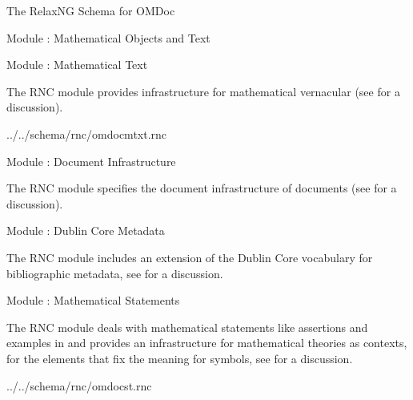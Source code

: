 \begin{tchapter}[id=rnc]{The RelaxNG Schema for OMDoc}
\begin{tsection}[id=rnc:math]{Module {}: Mathematical Objects and Text}

\end{tsection}

\begin{tsection}[id=rnc:mtxt]{Module {}: Mathematical Text}
  
 The RNC module {} provides infrastructure for mathematical
  vernacular (see {} for a discussion).

 
  {../../schema/rnc/omdocmtxt.rnc}
\end{tsection}

\begin{tsection}[id=rnc:doc]{Module {}: Document Infrastructure}
  
  The RNC module {} specifies the document infrastructure of
  {\omdoc} documents (see
  {} for a discussion).

  
  
\end{tsection}

\begin{tsection}[id=rnc:dc]{Module {}: Dublin Core Metadata}

  The RNC module {} includes an extension of the Dublin Core vocabulary for
  bibliographic metadata, see {} for a discussion.


\end{tsection}

\begin{tsection}[id=rnc:st]{Module {}: Mathematical Statements}

The RNC module {} deals with mathematical statements like assertions
and examples in {\omdoc} and provides an infrastructure for mathematical theories
as contexts, for the {\omdoc} elements that fix the meaning for symbols, see
{} for a discussion.

 {../../schema/rnc/omdocst.rnc}
\end{tsection}


\end{tchapter}
